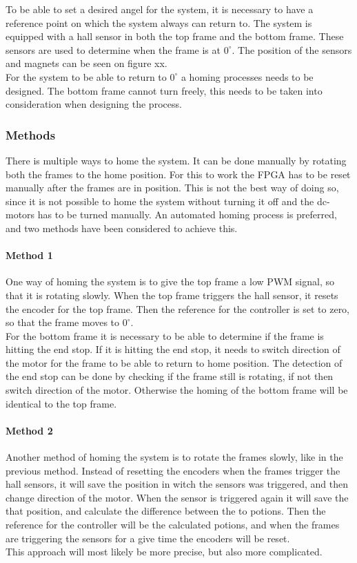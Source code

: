 \documentclass[../../../main]{subfiles}
\begin{document}
 
To be able to set a desired angel for the system, it is necessary to have a reference point on which the system always can return to. 
The system is equipped with a hall sensor in both the top frame and the bottom frame.
These sensors are used to determine when the frame is at $0^\circ$. The position of the sensors and magnets can be seen on figure xx. 
\\
For the system to be able to return to $0^\circ$ a homing processes needs to be designed.
The bottom frame cannot turn freely, this needs to be taken into consideration when designing the process.
\subsubsection{Methods} 
There is multiple ways to home the system. It can be done manually by rotating both the frames to the home position.
For this to work the FPGA has to be reset manually after the frames are in position.
This is not the best way of doing so, since it is not possible to home the system without turning it off and the dc-motors has to be turned manually.
An automated homing process is preferred, and two methods have been considered to achieve this. 

\paragraph{Method 1}%
\label{par:method_1}
One way of homing the system is to give the top frame a low PWM signal, so that it is rotating slowly. 
When the top frame triggers the hall sensor, it resets the encoder for the top frame. 
Then the reference for the controller is set to zero, so that the frame moves to $0^\circ$. 
\\
For the bottom frame it is necessary to be able to determine if the frame is hitting the end stop. 
If it is hitting the end stop, it needs to switch direction of the motor for the frame to be able to return to home position.
The detection of the end stop can be done by checking if the frame still is rotating, if not then switch direction of the motor.
Otherwise the homing of the bottom frame will be identical to the top frame.

\paragraph{Method 2}%
\label{par:method_2}
Another method of homing the system is to rotate the frames slowly, like in the previous method. 
Instead of resetting the encoders when the frames trigger the hall sensors, it will save the position in witch the sensors was triggered, and then change direction of the motor.
When the sensor is triggered again it will save the that position, and calculate the difference between the to potions. 
Then the reference for the controller will be the calculated potions, and when the frames are triggering the sensors for a give time the encoders will be reset.
\\
This approach will most likely be more precise, but also more complicated. 
\end{document}
